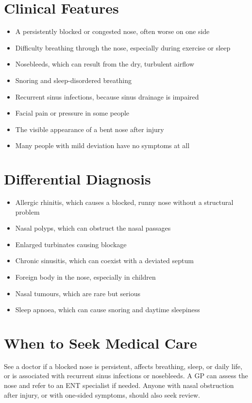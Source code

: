 \section*{Clinical Features}
\begin{itemize}
    \item A persistently blocked or congested nose, often worse on one side
    \item Difficulty breathing through the nose, especially during exercise or sleep
    \item Nosebleeds, which can result from the dry, turbulent airflow
    \item Snoring and sleep-disordered breathing
    \item Recurrent sinus infections, because sinus drainage is impaired
    \item Facial pain or pressure in some people
    \item The visible appearance of a bent nose after injury
    \item Many people with mild deviation have no symptoms at all
\end{itemize}

\section*{Differential Diagnosis}
\begin{itemize}
    \item Allergic rhinitis, which causes a blocked, runny nose without a structural problem
    \item Nasal polyps, which can obstruct the nasal passages
    \item Enlarged turbinates causing blockage
    \item Chronic sinusitis, which can coexist with a deviated septum
    \item Foreign body in the nose, especially in children
    \item Nasal tumours, which are rare but serious
    \item Sleep apnoea, which can cause snoring and daytime sleepiness
\end{itemize}

\section*{When to Seek Medical Care}
See a doctor if a blocked nose is persistent, affects breathing, sleep, or daily life, or is associated with recurrent sinus infections or nosebleeds. A GP can assess the nose and refer to an ENT specialist if needed. Anyone with nasal obstruction after injury, or with one-sided symptoms, should also seek review.

